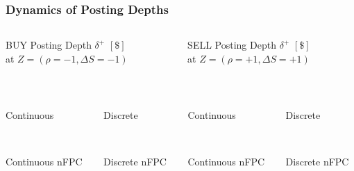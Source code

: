 \begin{frame}
\frametitle{Dynamics of Posting Depths}
\begin{columns}[T] %
\begin{column}{.48\textwidth}
BUY Posting Depth $\delta^+$ $[\$]$\\
at $Z=(\rho = -1, \Delta S = -1)$
\end{column}%
\hfill%
\begin{column}{.48\textwidth}
SELL Posting Depth $\delta^+$ $[\$]$\\
at $Z=(\rho = +1, \Delta S = +1)$
\end{column}%
\end{columns}
\vspace{\baselineskip}
\begin{columns}[T] %
\begin{column}{.24\textwidth}
\centering%
\\
{\scriptsize Continuous \par}
\\
{\scriptsize Continuous nFPC \par}
\end{column}%
\begin{column}{.24\textwidth}
\centering%
\\
{\scriptsize Discrete \par}
\\
{\scriptsize Discrete nFPC \par}
\end{column}%
\hfill%
\vrule{}
\hfill%
\begin{column}{.24\textwidth}
\centering%
\\
{\scriptsize Continuous \par}
\\
{\scriptsize Continuous nFPC \par}
\end{column}%
\begin{column}{.24\textwidth}
\centering%
\\
{\scriptsize Discrete \par}
\\
{\scriptsize Discrete nFPC \par}
\end{column}%
\end{columns}
\vspace{\baselineskip}
\centering
{}
\end{frame}

